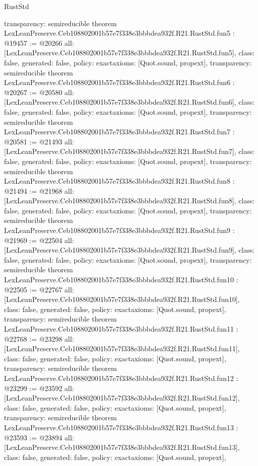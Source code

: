 \begin{lexlean}{RustStd}
\begin{coremodule}
{  transparency: semireducible
}
theorem LexLeanPreserve.Ceb108802001b57e7f338e3bbbdea932f.R21.RustStd.fun5 : @19457 := @20266 {
  all: [LexLeanPreserve.Ceb108802001b57e7f338e3bbbdea932f.R21.RustStd.fun5],
  class: false,
  generated: false,
  policy: exact{axioms: [Quot.sound, propext]},
  transparency: semireducible
}
theorem LexLeanPreserve.Ceb108802001b57e7f338e3bbbdea932f.R21.RustStd.fun6 : @20267 := @20580 {
  all: [LexLeanPreserve.Ceb108802001b57e7f338e3bbbdea932f.R21.RustStd.fun6],
  class: false,
  generated: false,
  policy: exact{axioms: [Quot.sound, propext]},
  transparency: semireducible
}
theorem LexLeanPreserve.Ceb108802001b57e7f338e3bbbdea932f.R21.RustStd.fun7 : @20581 := @21493 {
  all: [LexLeanPreserve.Ceb108802001b57e7f338e3bbbdea932f.R21.RustStd.fun7],
  class: false,
  generated: false,
  policy: exact{axioms: [Quot.sound, propext]},
  transparency: semireducible
}
theorem LexLeanPreserve.Ceb108802001b57e7f338e3bbbdea932f.R21.RustStd.fun8 : @21494 := @21968 {
  all: [LexLeanPreserve.Ceb108802001b57e7f338e3bbbdea932f.R21.RustStd.fun8],
  class: false,
  generated: false,
  policy: exact{axioms: [Quot.sound, propext]},
  transparency: semireducible
}
theorem LexLeanPreserve.Ceb108802001b57e7f338e3bbbdea932f.R21.RustStd.fun9 : @21969 := @22504 {
  all: [LexLeanPreserve.Ceb108802001b57e7f338e3bbbdea932f.R21.RustStd.fun9],
  class: false,
  generated: false,
  policy: exact{axioms: [Quot.sound, propext]},
  transparency: semireducible
}
theorem LexLeanPreserve.Ceb108802001b57e7f338e3bbbdea932f.R21.RustStd.fun10 : @22505 := @22767 {
  all: [LexLeanPreserve.Ceb108802001b57e7f338e3bbbdea932f.R21.RustStd.fun10],
  class: false,
  generated: false,
  policy: exact{axioms: [Quot.sound, propext]},
  transparency: semireducible
}
theorem LexLeanPreserve.Ceb108802001b57e7f338e3bbbdea932f.R21.RustStd.fun11 : @22768 := @23298 {
  all: [LexLeanPreserve.Ceb108802001b57e7f338e3bbbdea932f.R21.RustStd.fun11],
  class: false,
  generated: false,
  policy: exact{axioms: [Quot.sound, propext]},
  transparency: semireducible
}
theorem LexLeanPreserve.Ceb108802001b57e7f338e3bbbdea932f.R21.RustStd.fun12 : @23299 := @23592 {
  all: [LexLeanPreserve.Ceb108802001b57e7f338e3bbbdea932f.R21.RustStd.fun12],
  class: false,
  generated: false,
  policy: exact{axioms: [Quot.sound, propext]},
  transparency: semireducible
}
theorem LexLeanPreserve.Ceb108802001b57e7f338e3bbbdea932f.R21.RustStd.fun13 : @23593 := @23894 {
  all: [LexLeanPreserve.Ceb108802001b57e7f338e3bbbdea932f.R21.RustStd.fun13],
  class: false,
  generated: false,
  policy: exact{axioms: [Quot.sound, propext]},
}
\end{coremodule}
\end{lexlean}
